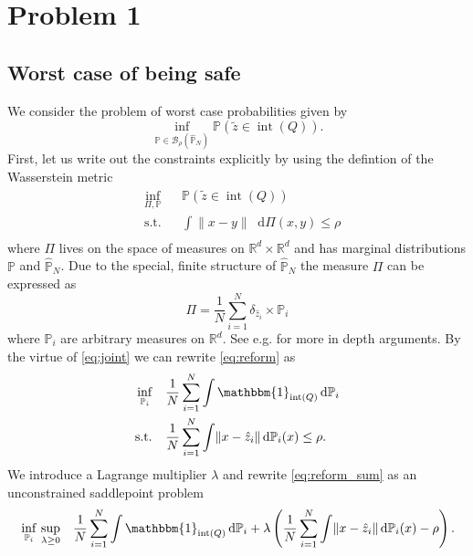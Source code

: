 \documentclass{scrartcl}
\newcommand*\diff{\mathop{}\!\mathrm{d}}
\renewcommand{\P}{\mathbb{P}}
\newcommand{\R}{\mathbb{R}}
\DeclareMathOperator*{\interior}{int}
\newcommand{\ball}{\mathcal{B}}
\begin{document}
\section*{Problem 1}
\label{sec:problem_one}

\subsection*{Worst case of being safe}
\label{sec:safe}
We consider the problem of worst case probabilities given by
\begin{equation}
  \label{eq:op_safe}
  \inf_{\P \in \ball_{\rho}(\hat{\P}_{N})} \P \left( \tilde{z} \in \interior (Q) \right).
\end{equation}
First, let us write out the constraints explicitly by using the defintion of the Wasserstein metric
\begin{equation}
  \label{eq:reform}
  \begin{aligned}
  & \inf_{\Pi, \P}  & & \P (\tilde{z} \in \interior (Q)) \\
  & \text{s.t.}    & & \int \lVert x-y  \rVert \diff \Pi(x,y) \le \rho \\
  \end{aligned}
\end{equation}
where $\Pi$ lives on the space of measures on $\R^d \times \R^d$ and has marginal
distributions $\P$ and $\hat{\P}_{N}$.
Due to the special, finite structure of $\hat{\P}_{N}$ the measure $\Pi$ can be
expressed as
\begin{equation}
  \label{eq:joint}
  \Pi = \frac{1}{N} \sum_{i=1}^N \delta_{\hat{z}_i} \times \P_i 
\end{equation}
where $\P_i$ are arbitrary measures on $\R^d$.
See e.g. \cite{kuhn2015dd-dro-wasserstein} for more in depth arguments.
By the virtue of \eqref{eq:joint} we can rewrite \eqref{eq:reform} as
\begin{equation}
  \label{eq:reform_sum}
  \begin{aligned}
 &   \inf_{\P_i}  & & \frac{1}{N} \sum_{i=1}^N \int \mathbbm{1}_{\interior(Q)} \diff \P_i \\
 &   \text{s.t.} & & \frac{1}{N} \sum_{i=1}^N \int \lVert x-\hat{z}_i  \rVert \diff \P_i(x) \le \rho.
  \end{aligned}
\end{equation}
We introduce a Lagrange multiplier $\lambda$ and rewrite \eqref{eq:reform_sum} as
an unconstrained saddlepoint problem
\begin{equation}
  \label{eq:reform_saddle}
  \begin{aligned}
 &   \inf_{\P_i} \, \sup_{\lambda \ge 0} & & \frac{1}{N} \sum_{i=1}^N \int \mathbbm{1}_{\interior(Q)} \diff \P_i + \lambda \left(\frac{1}{N} \sum_{i=1}^N \int \lVert x-\hat{z}_i  \rVert \diff \P_i(x) - \rho\right). \\
  \end{aligned}
\end{equation}
\end{document}
